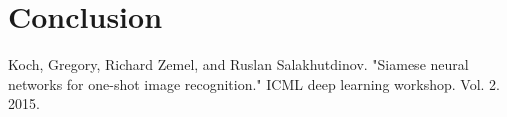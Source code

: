 \documentclass[runningheads]{llncs}
\begin{document}
\section{Conclusion}

%
%
%
% 
% 
%
\begin{thebibliography}{8}
Koch, Gregory, Richard Zemel, and Ruslan Salakhutdinov.
 "Siamese neural networks for one-shot image recognition." 
 ICML deep learning workshop. Vol. 2. 2015.


\end{thebibliography}
\end{document}
